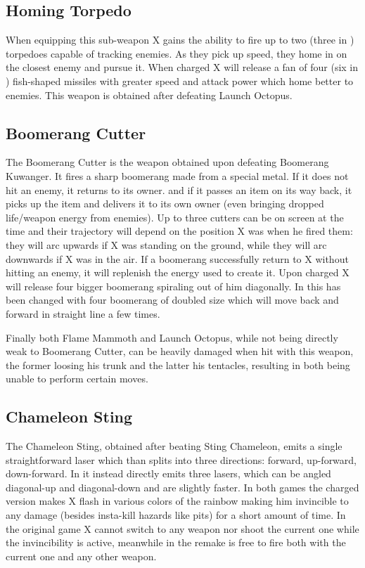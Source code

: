 \subsection{Homing Torpedo}
When equipping this sub-weapon X gains the ability to fire up to two (three in \mhx)\cite{wiki:Homing_torpedo} torpedoes capable of tracking enemies. As they pick up speed, they home in on the closest enemy and pursue it. When charged X will release a fan of four (six in \mhx) fish-shaped missiles with greater speed and attack power which home better to enemies. This weapon is obtained after defeating Launch Octopus.
\subsection{Boomerang Cutter}
The Boomerang Cutter is the weapon obtained upon defeating Boomerang Kuwanger. It fires a sharp boomerang made from a special metal. If it does not hit an enemy, it returns to its owner. and if it passes an item on its way back, it picks up the	item and delivers it to its own owner (even bringing dropped life/weapon energy from enemies). Up to three cutters can be on screen at the time\cite{wiki:Boomerang_cutter} and their trajectory will depend on the position X was when he fired them: they will arc upwards if X was standing on the ground, while they will arc downwards if X was in the air. If a boomerang successfully return to X without hitting an enemy, it will replenish the energy used to create it. Upon charged X will release four bigger boomerang spiraling out of him diagonally. In \mhx this has been changed with four boomerang of doubled size which will move back and forward in straight line a few times. 

Finally both Flame Mammoth and Launch Octopus, while not being directly weak to Boomerang Cutter, can be heavily damaged when hit with this weapon, the former loosing his trunk and the latter his tentacles, resulting in both being unable to perform certain moves.
\subsection{Chameleon Sting}
The Chameleon Sting, obtained after beating Sting Chameleon, emits a single straightforward laser which than splits into three directions: forward, up-forward, down-forward. In \mhx it instead directly emits three lasers, which can be angled diagonal-up and diagonal-down and are slightly faster. In both games the charged version makes X flash in various colors of the rainbow making him invincible to any damage (besides insta-kill hazards like pits) for a short amount of time. In the original game X cannot switch to any weapon nor shoot the current one while the invincibility is active, meanwhile in the remake is free to fire both with the current one and any other weapon\cite{wiki:Chameleon_sting}.
